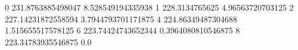 0 231.8763885498047 8.528549194335938
1 228.3134765625 4.96563720703125
2 227.14231872558594 3.7944793701171875
4 224.86349487304688 1.515655517578125
6 223.74424743652344 0.3964080810546875
8 223.34783935546875 0.0
